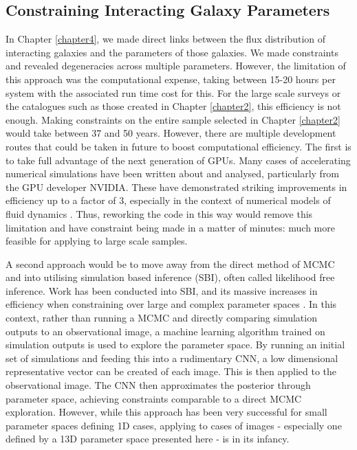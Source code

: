 \subsection{Constraining Interacting Galaxy Parameters}
\noindent In Chapter \ref{chapter4}, we made direct links between the flux distribution of interacting galaxies and the parameters of those galaxies. We made constraints and revealed degeneracies across multiple parameters. However, the limitation of this approach was the computational expense, taking between 15-20 hours per system with the associated run time cost for this. For the large scale surveys or the catalogues such as those created in Chapter \ref{chapter2}, this efficiency is not enough. Making constraints on the entire sample selected in Chapter \ref{chapter2} would take between 37 and 50 years. However, there are multiple development routes that could be taken in future to boost computational efficiency. The first is to take full advantage of the next generation of GPUs. Many cases of accelerating numerical simulations have been written about and analysed, particularly from the GPU developer NVIDIA. These have demonstrated striking improvements in efficiency up to a factor of 3, especially in the context of numerical models of fluid dynamics \citep[recent examples include][]{Mantas2016, COSTA2021502}. Thus, reworking the code in this way would remove this limitation and have constraint being made in a matter of minutes: much more feasible for applying to large scale samples.

A second approach would be to move away from the direct method of MCMC and into utilising simulation based inference (SBI), often called likelihood free inference. Work has been conducted into SBI, and its massive increases in efficiency when constraining over large and complex parameter spaces \citep[for an excellent description of likelihood free inference, see][]{2021MNRAS.501..954J}. In this context, rather than running a MCMC and directly comparing simulation outputs to an observational image, a machine learning algorithm trained on simulation outputs is used to explore the parameter space. By running an initial set of simulations and feeding this into a rudimentary CNN, a low dimensional representative vector can be created of each image. This is then applied to the observational image. The CNN then approximates the posterior through parameter space, achieving constraints comparable to a direct MCMC exploration. However, while this approach has been very successful for small parameter spaces defining 1D cases, applying to cases of images - especially one defined by a 13D parameter space presented here - is in its infancy. 

